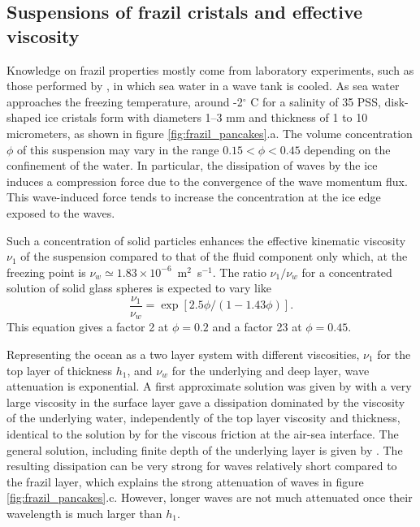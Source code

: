 \subsection{Suspensions of frazil cristals and effective viscosity}
Knowledge on frazil properties mostly come from laboratory experiments, such as those performed by  \cite{Martin&Kauffman1981}, in which sea water in a wave tank is cooled. As sea water approaches the freezing temperature, around -2$^\circ$ C for a salinity of 35 PSS, disk-shaped ice cristals form with diameters 1--3 mm and thickness of 1 to 10 micrometers, as shown in figure \ref{fig:frazil_pancakes}.a. The volume concentration $\phi$ of this suspension may vary in the range  $0.15<\phi<0.45$ depending on the confinement of the water. In particular, the dissipation of waves by the ice induces a compression force due to the convergence of the wave momentum flux. This wave-induced force tends to increase the concentration at the ice edge exposed to the waves. 

Such a concentration of solid particles enhances the effective kinematic viscosity $\nu_1$ of the suspension compared to that of the fluid component only which, at the freezing point is $\nu_w \simeq 1.83 \times 10^{-6}$~m$^2$~s$^{-1}$. The ratio $\nu_1/\nu_w$ for a concentrated solution of solid glass spheres 
is expected to vary like \citep{Mooney1951}
\begin{equation}
\frac{\nu_1}{\nu_w} = \exp \left[2.5 \phi /(1-1.43 \phi)\right].\label{eq:visc_Mooney}
\end{equation}
 This equation gives a factor 2 at $\phi=0.2$ and a factor 23 at $\phi=0.45$. 
 
Representing the ocean as a two layer system with different viscosities, $\nu_1$ for the top layer of thickness $h_1$, and $\nu_w$ for the underlying and deep layer, wave attenuation is exponential. A first approximate solution was given by \cite{Weber1987} with a very large viscosity in the surface layer gave a dissipation dominated by the viscosity of the underlying water, independently of the top layer viscosity and thickness, identical to the solution by 
\cite{Dore1978} for the viscous friction at the air-sea interface. The general solution, including finite depth of the underlying layer is given by \cite{Keller1998}. The resulting dissipation can be very strong for waves relatively short compared to the frazil layer, which explains the strong attenuation of waves in figure \ref{fig:frazil_pancakes}.c. However, longer waves are not much attenuated once their wavelength is much larger than $h_1$. 

